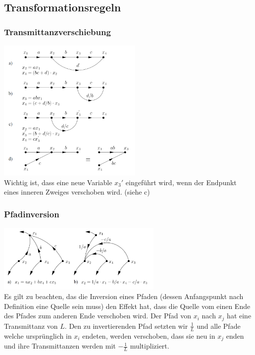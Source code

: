 \subsection{Transformationsregeln }
  \begin{multicols}{2}
    \subsubsection{Transmittanzverschiebung}
      \includegraphics[width=7cm]{./images/transmittanzverschiebung.png} \\
      Wichtig ist, dass eine neue Variable $x_3'$ eingeführt wird, wenn der Endpunkt eines
      inneren Zweiges verschoben wird. \newline (siehe c)
      \vfill
  \columnbreak
  
    \subsubsection{Pfadinversion}
      \includegraphics[width=8cm]{./images/pfadinversion.png} \\
      Es gilt zu beachten, das die Inversion eines Pfaden (dessen Anfangspunkt nach Definition
      eine Quelle sein muss) den Effekt hat, dass die Quelle vom einen Ende des Pfades zum anderen
      Ende verschoben wird. Der Pfad von $x_i$ nach $x_j$ hat eine Transmittanz von $L$. 
      Den zu invertierenden Pfad setzten wir $\frac{1}{L}$ und alle Pfade welche ursprünglich in
      $x_i$ endeten, werden verschoben, dass sie neu in $x_j$ enden und ihre Transmittanzen werden
      mit $-\frac{1}{L}$ multipliziert.
      

\end{multicols}
